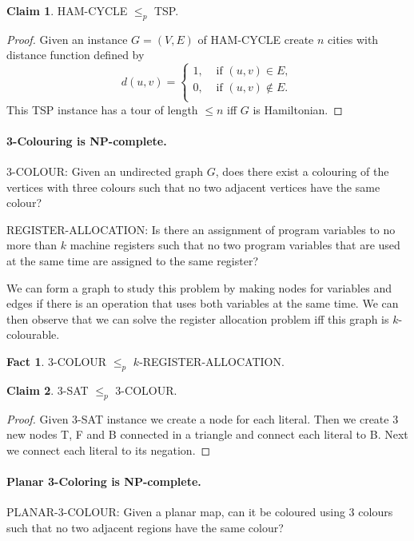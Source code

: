 \documentclass[11pt,a4paper]{article}
\theoremstyle{definition}
\newtheorem{claim}{Claim}
\newtheorem*{fact}{Fact}
\begin{document}
\begin{claim}
HAM-CYCLE $\le_p$ TSP.
\end{claim}
\begin{proof}
Given an instance $G= (V,E)$ of HAM-CYCLE create $n$ cities with distance function defined by
\[
d(u,v) =\begin{cases}
1, &\text{ if } (u,v) \in E,\\
0, &\text{ if } (u,v) \not\in E.\\
\end{cases} 
\]
This TSP instance has a tour of length $\le n$ iff $G$ is Hamiltonian.
\end{proof}

\paragraph{3-Colouring is NP-complete.}
3-COLOUR: Given an undirected graph $G$, does there exist a colouring of the vertices with three colours such that no two adjacent vertices have the same colour?

REGISTER-ALLOCATION: Is there an assignment of program variables to no more than $k$ machine registers such that no two program variables that are used at the same time are assigned to the same register?

We can form a graph to study this problem by making nodes for variables and edges if there is an operation that uses both variables at the same time.
We can then observe that we can solve the register allocation problem iff this graph is $k$-colourable.

\begin{fact}
3-COLOUR $\le_p$ $k$-REGISTER-ALLOCATION.
\end{fact}

\begin{claim}
3-SAT $\le_p$ 3-COLOUR.
\end{claim}
\begin{proof}
Given 3-SAT instance we create a node for each literal.
Then we create 3 new nodes T, F and B connected in a triangle and connect each literal to B.
Next we connect each literal to its negation.
\end{proof}

\paragraph{Planar 3-Coloring is NP-complete.}
PLANAR-3-COLOUR: Given a planar map, can it be coloured using 3 colours such that no two adjacent regions have the same colour?
\end{document}
